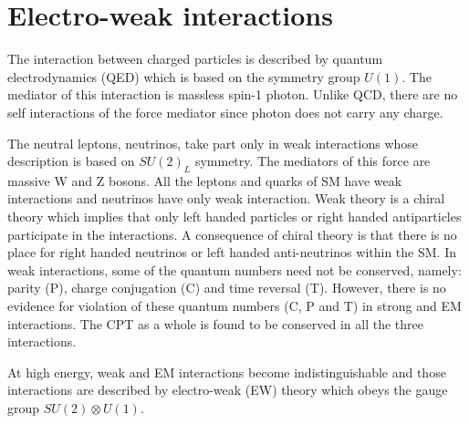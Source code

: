 \section{Electro-weak interactions}\label{sec:EWint}
The interaction between charged particles is described by quantum electrodynamics (QED) which is based on the symmetry group $U(1)$. The 
mediator of this interaction is massless spin-1 photon. Unlike QCD, there are no self interactions of the force mediator since photon does 
not carry any charge.

The neutral leptons, neutrinos, take part only in weak interactions whose description is based on $SU(2)_L$ symmetry. The mediators of 
this force are massive W and Z bosons. All the leptons and quarks of SM have weak interactions and neutrinos have only weak interaction. 
Weak theory is a chiral theory which implies that only left handed particles or right handed antiparticles participate in the 
interactions. A consequence of chiral theory is that there is no place for right handed neutrinos or left handed anti-neutrinos within the SM. 
In weak interactions, some of the quantum numbers need not be conserved, namely: parity (P), charge conjugation (C) and time reversal (T).
However, there is no evidence for violation of these quantum numbers (C, P and T) in strong and EM interactions. The CPT as a whole is 
found to be conserved in all the three interactions.

At high energy, weak and EM interactions become indistinguishable and those interactions are described by electro-weak (EW) theory 
\cite{PhysRevLett.19.1264}\cite{Salam1959}\cite{Glashow:1959wxa} which obeys the gauge group $SU(2)\otimes U(1)$.

